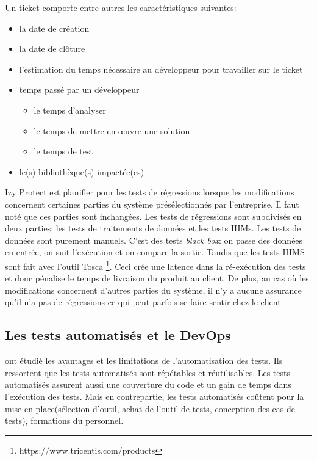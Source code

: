 \documentclass[a4paper]{article}
\begin{document}
Un ticket comporte entre autres les caractéristiques suivantes:

\begin{itemize}
\item la date de création
\item la date de clôture
\item l'estimation du temps nécessaire au développeur pour travailler sur le ticket
\item temps passé par un développeur
\begin{itemize}
\item le temps d'analyser
\item le temps de mettre en œuvre une solution
\item le temps de test
\end{itemize}
\item le(s) bibliothèque(s) impactée(es)
\end{itemize}

Izy Protect  est planifier pour les tests de régressions lorsque  les modifications concernent certaines parties du système présélectionnés par l'entreprise.
Il faut noté que ces parties sont inchangées.
Les tests de régressions sont subdivisés en deux parties: les tests de traitements de données et les tests IHMs.
Les tests de données sont purement manuels. C'est des tests \textit{black box}: on passe des données en entrée, on suit l'exécution et on compare la sortie. 
Tandis que les tests IHMS sont fait avec l'outil Tosca \footnote{https://www.tricentis.com/products}. 
Ceci crée une latence dans la ré-exécution des tests et donc pénalise le temps de livraison du produit au client.
De plus, au cas où les modifications concernent d'autres parties du système, il n'y a aucune assurance qu'il n'a pas de régressions ce qui peut parfois se faire sentir chez le client.

\subsection{Les tests automatisés et le DevOps}

\citet{Dude12a}  ont étudié les avantages et les limitations de l'automatisation des tests.
Ils ressortent que  les tests automatisés sont  répétables et réutilisables.
Les tests automatisés assurent aussi une couverture du code et un gain de temps dans l'exécution des tests.
Mais en contrepartie, les tests automatisés coûtent pour la mise en place(sélection d'outil, achat de l'outil de tests, conception des cas de tests), formations du personnel.
\end{document}
